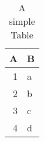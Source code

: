 \begin{table}[h]
\centering
\caption{A simple Table}
\label{tab:table1}
\begin{tabular}{rl}
\toprule
 A & B \\
\midrule
 1 & a \\
 2 & b \\
 3 & c \\
 4 & d \\
\bottomrule
\end{tabular}
\end{table}
